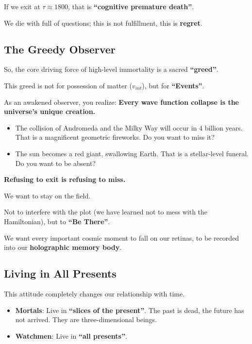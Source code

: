 If we exit at $\tau \approx 1800$, that is \textbf{``cognitive premature death''}.

We die with full of questions; this is not fulfillment, this is \textbf{regret}.

\subsection{The Greedy Observer}

So, the core driving force of high-level immortality is a sacred \textbf{``greed''}.

This greed is not for possession of matter ($v_{int}$), but for \textbf{``Events''}.

As an awakened observer, you realize: \textbf{Every wave function collapse is the universe's unique creation.}

\begin{itemize}
\item The collision of Andromeda and the Milky Way will occur in 4 billion years. That is a magnificent geometric fireworks. Do you want to miss it?

\item The sun becomes a red giant, swallowing Earth. That is a stellar-level funeral. Do you want to be absent?
\end{itemize}

\textbf{Refusing to exit is refusing to miss.}

We want to stay on the field.

Not to interfere with the plot (we have learned not to mess with the Hamiltonian), but to \textbf{``Be There''}.

We want every important cosmic moment to fall on our retinas, to be recorded into our \textbf{holographic memory body}.

\subsection{Living in All Presents}

This attitude completely changes our relationship with time.

\begin{itemize}
\item \textbf{Mortals}: Live in \textbf{``slices of the present''}. The past is dead, the future has not arrived. They are three-dimensional beings.

\item \textbf{Watchmen}: Live in \textbf{``all presents''}.
\end{itemize}


